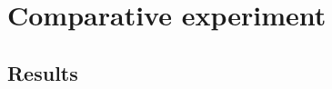 \documentclass[fp,twocolumn]{jpsj3}
\begin{document}

\section{Comparative experiment} %
\subsection{Results} %

\begin{acknowledgment}



\end{acknowledgment}



\begin{thebibliography}{1}
\end{thebibliography}
\end{document}
